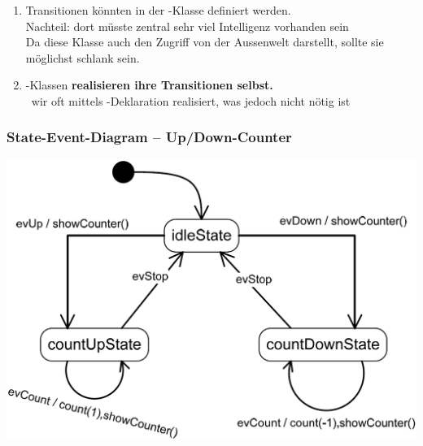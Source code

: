 \vspace{0.2cm}

\begin{enumerate}
    \item Transitionen könnten in der -Klasse definiert werden. \\
        Nachteil: dort müsste zentral sehr viel Intelligenz vorhanden sein \\
        Da diese Klasse auch den Zugriff von der Aussenwelt darstellt, sollte sie möglichst schlank sein.
    \item {}-Klassen \textbf{realisieren ihre Transitionen selbst.} \\
        \textrightarrow\ wir oft mittels -Deklaration realisiert, was jedoch nicht nötig ist
\end{enumerate}


\subsubsection{State-Event-Diagram -- Up/Down-Counter}
\label{State-Event-Diagram -- Up/Down-Counter - StatePattern}

\begin{center}
    \includegraphics[width=0.75\columnwidth]{images/fsm_up-down-counter_diagramm_state_pattern.png}
\end{center}





